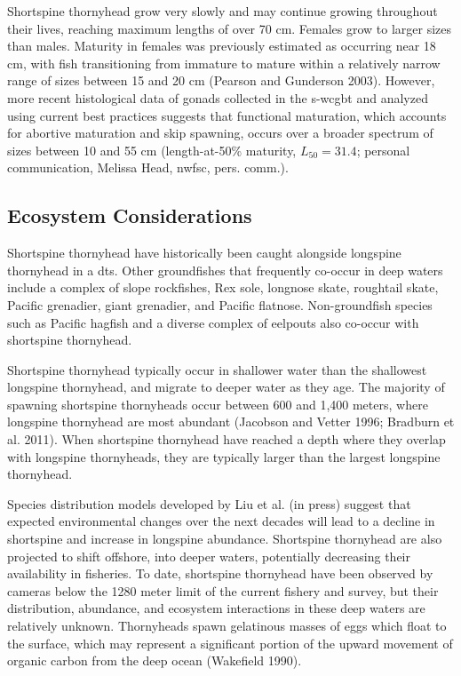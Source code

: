 \documentclass[11pt,
  letterpaper,
]{article}
\begin{document}
Shortspine thornyhead grow very slowly and may continue growing throughout their lives, reaching maximum lengths of over 70 cm. Females grow to larger sizes than males. Maturity in females was previously estimated as occurring near 18 cm, with fish transitioning from immature to mature within a relatively narrow range of sizes between 15 and 20 cm (Pearson and Gunderson 2003). However, more recent histological data of gonads collected in the \gls{s-wcgbt} and analyzed using current best practices suggests that functional maturation, which accounts for abortive maturation and skip spawning, occurs over a broader spectrum of sizes between 10 and 55 cm (length-at-50\% maturity, \(L_{50} =31.4\); personal communication, Melissa Head, \gls{nwfsc}, pers. comm.).

\hypertarget{ecosystem-considerations-1}{%
\subsection{Ecosystem Considerations}\label{ecosystem-considerations-1}}

Shortspine thornyhead have historically been caught alongside longspine thornyhead in a \gls{dts}. Other groundfishes that frequently co-occur in deep waters include a complex of slope rockfishes, Rex sole, longnose skate, roughtail skate, Pacific grenadier, giant grenadier, and Pacific flatnose. Non-groundfish species such as Pacific hagfish and a diverse complex of eelpouts also co-occur with shortspine thornyhead.

Shortspine thornyhead typically occur in shallower water than the shallowest longspine thornyhead, and migrate to deeper water as they age. The majority of spawning shortspine thornyheads occur between 600 and 1,400 meters, where longspine thornyhead are most abundant (Jacobson and Vetter 1996; Bradburn et al. 2011). When shortspine thornyhead have reached a depth where they overlap with longspine thornyheads, they are typically larger than the largest longspine thornyhead.

Species distribution models developed by Liu et al. (in press) suggest that expected environmental changes over the next decades will lead to a decline in shortspine and increase in longspine abundance. Shortspine thornyhead are also projected to shift offshore, into deeper waters, potentially decreasing their availability in fisheries. To date, shortspine thornyhead have been observed by cameras below the 1280 meter limit of the current fishery and survey, but their distribution, abundance, and ecosystem interactions in these deep waters are relatively unknown. Thornyheads spawn gelatinous masses of eggs which float to the surface, which may represent a significant portion of the upward movement of organic carbon from the deep ocean (Wakefield 1990).
\end{document}
